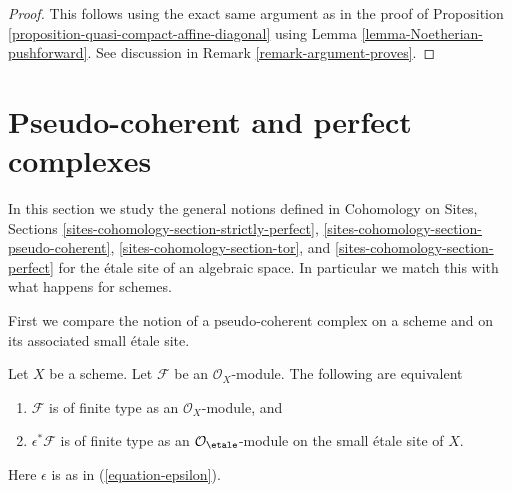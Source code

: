 \begin{proof}
This follows using the exact same argument as in the proof of
Proposition \ref{proposition-quasi-compact-affine-diagonal}
using Lemma \ref{lemma-Noetherian-pushforward}.
See discussion in Remark \ref{remark-argument-proves}.
\end{proof}













\section{Pseudo-coherent and perfect complexes}
\label{section-spell-out}

\noindent
In this section we study the general notions defined in
Cohomology on Sites, Sections
\ref{sites-cohomology-section-strictly-perfect},
\ref{sites-cohomology-section-pseudo-coherent},
\ref{sites-cohomology-section-tor}, and
\ref{sites-cohomology-section-perfect}
for the \'etale site of an algebraic space. In particular we
match this with what happens for schemes.

\medskip\noindent
First we compare the notion of a pseudo-coherent complex on a
scheme and on its associated small \'etale site.

\begin{lemma}
\label{lemma-descend-finite-type}
Let $X$ be a scheme. Let $\mathcal{F}$ be an $\mathcal{O}_X$-module.
The following are equivalent
\begin{enumerate}
\item $\mathcal{F}$ is of finite type as an $\mathcal{O}_X$-module, and
\item $\epsilon^*\mathcal{F}$ is of finite type as an
$\mathcal{O}_\etale$-module on the small \'etale site of $X$.
\end{enumerate}
Here $\epsilon$ is as in (\ref{equation-epsilon}).
\end{lemma}

